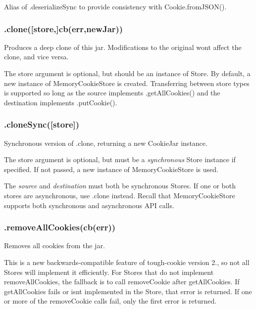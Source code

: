 Alias of {\ttfamily .deserialize\+Sync} to provide consistency with {\ttfamily Cookie.\+from\+J\+S\+O\+N()}.

\subsubsection*{{\ttfamily .clone(\mbox{[}store,\mbox{]}cb(err,new\+Jar))}}

Produces a deep clone of this jar. Modifications to the original won\textquotesingle{}t affect the clone, and vice versa.

The {\ttfamily store} argument is optional, but should be an instance of {\ttfamily Store}. By default, a new instance of {\ttfamily Memory\+Cookie\+Store} is created. Transferring between store types is supported so long as the source implements {\ttfamily .get\+All\+Cookies()} and the destination implements {\ttfamily .put\+Cookie()}.

\subsubsection*{{\ttfamily .clone\+Sync(\mbox{[}store\mbox{]})}}

Synchronous version of {\ttfamily .clone}, returning a new {\ttfamily Cookie\+Jar} instance.

The {\ttfamily store} argument is optional, but must be a {\itshape synchronous} {\ttfamily Store} instance if specified. If not passed, a new instance of {\ttfamily Memory\+Cookie\+Store} is used.

The {\itshape source} and {\itshape destination} must both be synchronous {\ttfamily Store}s. If one or both stores are asynchronous, use {\ttfamily .clone} instead. Recall that {\ttfamily Memory\+Cookie\+Store} supports both synchronous and asynchronous A\+PI calls.

\subsubsection*{{\ttfamily .remove\+All\+Cookies(cb(err))}}

Removes all cookies from the jar.

This is a new backwards-\/compatible feature of {\ttfamily tough-\/cookie} version 2., so not all Stores will implement it efficiently. For Stores that do not implement {\ttfamily remove\+All\+Cookies}, the fallback is to call {\ttfamily remove\+Cookie} after {\ttfamily get\+All\+Cookies}. If {\ttfamily get\+All\+Cookies} fails or isn\textquotesingle{}t implemented in the Store, that error is returned. If one or more of the {\ttfamily remove\+Cookie} calls fail, only the first error is returned.

